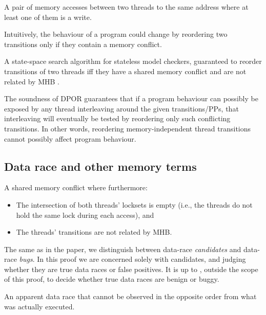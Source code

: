\begin{definition}
A pair of memory accesses between two threads to the same address where at least one of them is a write.
\end{definition}
Intuitively, the behaviour of a program could change by reordering two transitions only if they contain a memory conflict.

\begin{definition}
	A state-space search algorithm for stateless model checkers,
	guaranteed to reorder transitions of two threads
	iff they have a shared memory conflict and are not related by MHB \cite{dpor}.
	\label{def:dpor}
\end{definition}

The soundness of DPOR guarantees that if a program behaviour can possibly be exposed by any thread interleaving around the given transitions/PPs,
that interleaving will eventually be tested by reordering only such conflicting transitions.
In other words, reordering memory-independent thread transitions cannot possibly affect program behaviour.

\subsection{Data race and other memory terms}

\begin{definition}
A shared memory conflict where furthermore:
\begin{itemize}
	\item The intersection of both threads' locksets is empty (i.e., the threads do not hold the same lock during each access), and
	\item The threads' transitions are not related by MHB.
\end{itemize}
\end{definition}

The same as in the paper, we distinguish between data-race {\em candidates} and data-race {\em bugs}.
In this proof we are concerned solely with candidates, and judging whether they are true data races or false positives.
It is up to \quicksand, outside the scope of this proof, to decide whether true data races are benign or buggy.

\begin{definition}
	An apparent data race that cannot be observed in the opposite order from what was actually executed.
\end{definition}

